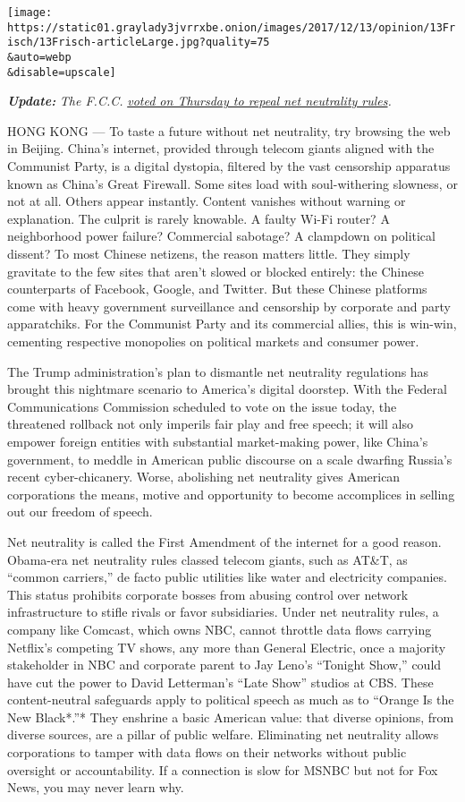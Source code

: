 \texttt{[image: https://static01.graylady3jvrrxbe.onion/images/2017/12/13/opinion/13Frisch/13Frisch-articleLarge.jpg?quality=75\\\&auto=webp\\\&disable=upscale]}

\emph{\textbf{Update:}} \emph{The F.C.C.}
\href{https://www.nytimes3xbfgragh.onion/2017/12/14/technology/net-neutrality-repeal-vote.html?_r=0}{\emph{voted
on Thursday to repeal net neutrality rules}}\emph{.}

HONG KONG --- To taste a future without net neutrality, try browsing the
web in Beijing. China's internet, provided through telecom giants
aligned with the Communist Party, is a digital dystopia, filtered by the
vast censorship apparatus known as China's Great Firewall. Some sites
load with soul-withering slowness, or not at all. Others appear
instantly. Content vanishes without warning or explanation. The culprit
is rarely knowable. A faulty Wi-Fi router? A neighborhood power failure?
Commercial sabotage? A clampdown on political dissent? To most Chinese
netizens, the reason matters little. They simply gravitate to the few
sites that aren't slowed or blocked entirely: the Chinese counterparts
of Facebook, Google, and Twitter. But these Chinese platforms come with
heavy government surveillance and censorship by corporate and party
apparatchiks. For the Communist Party and its commercial allies, this is
win-win, cementing respective monopolies on political markets and
consumer power.

The Trump administration's plan to dismantle net neutrality regulations
has brought this nightmare scenario to America's digital doorstep. With
the Federal Communications Commission scheduled to vote on the issue
today, the threatened rollback not only imperils fair play and free
speech; it will also empower foreign entities with substantial
market-making power, like China's government, to meddle in American
public discourse on a scale dwarfing Russia's recent cyber-chicanery.
Worse, abolishing net neutrality gives American corporations the means,
motive and opportunity to become accomplices in selling out our freedom
of speech.

Net neutrality is called the First Amendment of the internet for a good
reason. Obama-era net neutrality rules classed telecom giants, such as
AT\&T, as ``common carriers,'' de facto public utilities like water and
electricity companies. This status prohibits corporate bosses from
abusing control over network infrastructure to stifle rivals or favor
subsidiaries. Under net neutrality rules, a company like Comcast, which
owns NBC, cannot throttle data flows carrying Netflix's competing TV
shows, any more than General Electric, once a majority stakeholder in
NBC and corporate parent to Jay Leno's ``Tonight Show,'' could have cut
the power to David Letterman's ``Late Show'' studios at CBS. These
content-neutral safeguards apply to political speech as much as to
``Orange Is the New Black*.''* They enshrine a basic American value:
that diverse opinions, from diverse sources, are a pillar of public
welfare. Eliminating net neutrality allows corporations to tamper with
data flows on their networks without public oversight or accountability.
If a connection is slow for MSNBC but not for Fox News, you may never
learn why.

